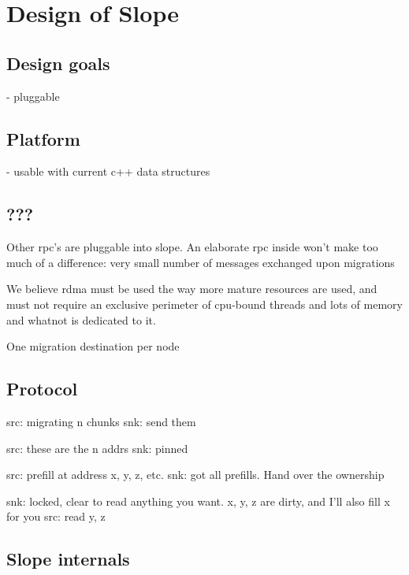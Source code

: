 \chapter{Design of Slope}
\label{chap:design}

\section{Design goals}
- pluggable

\section{Platform}
- usable with current c++ data structures

\section{???}

Other rpc's are pluggable into slope.
An elaborate rpc inside won't make too much of a difference: very small number of messages exchanged upon migrations

We believe rdma must be used the way more mature resources are used, and must not require an exclusive perimeter of cpu-bound threads and lots of memory and whatnot is dedicated to it.

One migration destination per node

\section{Protocol}
src: migrating n chunks
snk: send them

src: these are the n addrs
snk: pinned

src: prefill at address x, y, z, etc.
snk: got all prefills. Hand over the ownership

snk: locked, clear to read anything you want. x, y, z are dirty, and I'll also fill x for you
src: read y, z


\section{Slope internals}


